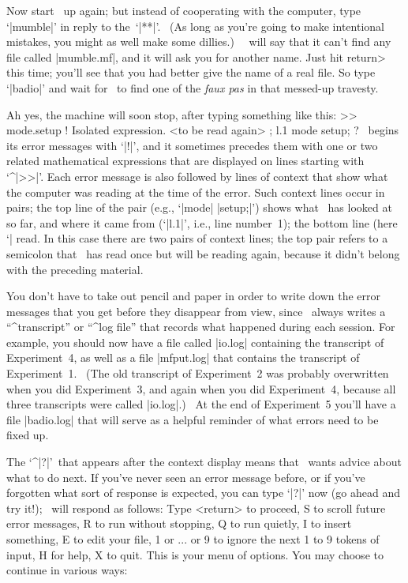 Now start \MF\ up again; but instead of cooperating with the computer, type
`|mumble|' in reply to the~`|**|'. \ (As long as you're going to make
intentional mistakes, you might as well make some dillies.) \
\MF\ will say that it can't find any file called |mumble.mf|,
and it will ask you for another name. Just hit \<return> this time;
you'll see that you had better give the name of a real file.
So type `|badio|' and wait for \MF\ to find one of the {\sl faux pas\/}
in that messed-up travesty.

Ah yes, the machine will soon stop, after typing something like this:
\begintt
>> mode.setup
! Isolated expression.
<to be read again>
                   ;
l.1 mode setup;
?
\endtt
\MF\ begins its error messages with `|!|', and it sometimes precedes them
with one or two related mathematical expressions that are displayed on
lines starting with `^|>>|'.  Each error message is also followed by lines
of context that show what the computer was reading at the time of the
error. Such context lines occur in pairs; the top line of the pair (e.g.,
`|mode| |setup;|'\thinspace) shows what \MF\ has looked at so far, and
where it came from (`|l.1|', i.e., line number~1); the bottom line (here
`|%
read. In this case there are two pairs of context lines; the top pair
refers to a semicolon that \MF\ has read once but will be reading again,
because it didn't belong with the preceding material.

You don't have to take out pencil and paper in order to write down the
error messages that you get before they disappear from view, since \MF\
always writes a ``^{transcript}'' or ``^{log file}'' that records what
happened during each session. For example, you should now have a file
called |io.log| containing the transcript of Experiment~4, as well as a file
|mfput.log| that contains the transcript of Experiment~1. \ (The old
transcript of Experiment~2 was probably overwritten when you did
Experiment~3, and again when you did Experiment~4, because all three
transcripts were called |io.log|.) \ At the end of Experiment~5 you'll
have a file |badio.log| that will serve as a helpful reminder of
what errors need to be fixed up.

The `^|?|'\ that appears after the context display means that \MF\ wants
advice about what to do next. If you've never seen an error message before,
or if you've forgotten what sort of response is expected, you can type
`|?|' now (go ahead and try it!); \MF\ will respond as follows:
\begintt
Type <return> to proceed, S to scroll future error messages,
R to run without stopping, Q to run quietly,
I to insert something, E to edit your file,
1 or ... or 9 to ignore the next 1 to 9 tokens of input,
H for help, X to quit.
\endtt
This is your menu of options. You may choose to continue in various ways:

